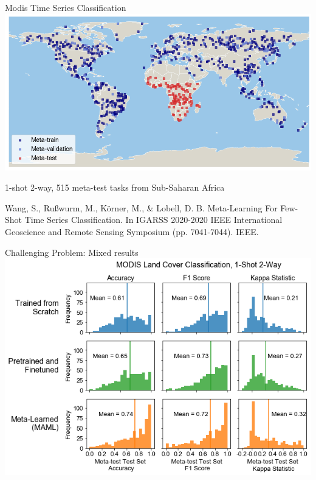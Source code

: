 \documentclass[11pt]{beamer}
\newcommand{\citeapa}[1]{ {\tiny#1\par} }
\begin{document}
	\begin{frame}{Modis Time Series Classification}
		\centering
				\includegraphics[width=.75\textwidth]{igarss2020/modis_task_map}
				
		\vfill
		
		1-shot 2-way, 515 meta-test tasks from Sub-Saharan  Africa

		\citeapa{Wang, S., Rußwurm, M., Körner, M., \& Lobell, D. B. Meta-Learning For Few-Shot Time Series Classification. In IGARSS 2020-2020 IEEE International Geoscience and Remote Sensing Symposium (pp. 7041-7044). IEEE.}
	\end{frame}

	\begin{frame}{Challenging Problem: Mixed results}
		\includegraphics[width=\textwidth]{igarss2020/modis_africa_histograms_narrow}
	\end{frame}
\end{document}
